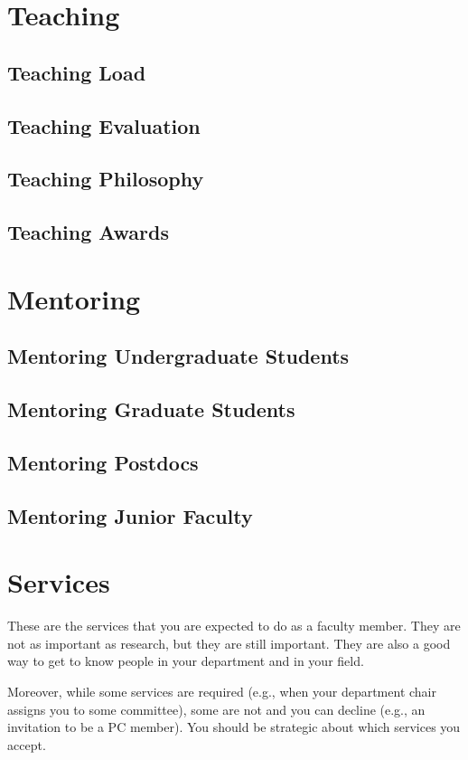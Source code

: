 \documentclass[oneside,11pt]{memoir}
\begin{document}
\chapter{Teaching}
\section{Teaching Load}
\section{Teaching Evaluation}
\section{Teaching Philosophy}
\section{Teaching Awards}



\chapter{Mentoring}
\section{Mentoring Undergraduate Students}
\section{Mentoring Graduate Students}
\section{Mentoring Postdocs}
\section{Mentoring Junior Faculty}

\chapter{Services}
These are the services that you are expected to do as a faculty member.  They are not as important as research, but they are still important.  They are also a good way to get to know people in your department and in your field.


Moreover, while some services are required (e.g., when your department chair assigns you to some committee), some are not and you can decline (e.g., an invitation to be a PC member).  You should be strategic about which services you accept.
\end{document}
